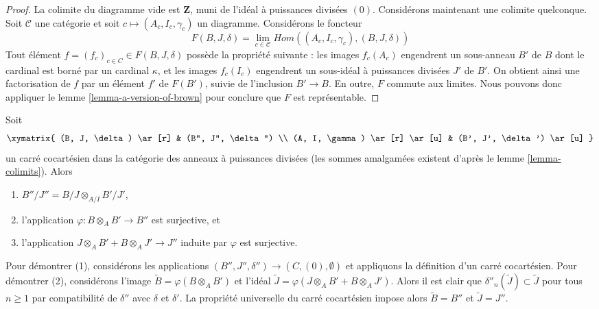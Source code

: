 \begin{proof}

La colimite du diagramme vide est $\mathbf{Z}$, muni de l'idéal à puissances divisées $(0)$. Considérons maintenant une colimite quelconque. Soit $\mathcal{C}$ une catégorie et soit
$c \mapsto (A_c, I_c, \gamma_c)$ un diagramme. Considérons le foncteur
$$
F(B, J, \delta) = \lim_{c \in \mathcal{C}}
Hom((A_c, I_c, \gamma_c), (B, J, \delta))
$$
Tout élément $f = (f_c)_{c \in C} \in F(B, J, \delta)$ possède la propriété suivante : les images $f_c(A_c)$ engendrent un sous-anneau $B'$ de $B$ dont le cardinal est borné par un cardinal $\kappa$, et les images $f_c(I_c)$ engendrent un sous-idéal à puissances divisées $J'$ de $B'$. On obtient ainsi une factorisation de
$f$ par un élément $f'$ de $F(B')$, suivie de l'inclusion $B' \to B$. En outre,
$F$ commute aux limites. Nous pouvons donc appliquer le lemme \ref{lemma-a-version-of-brown}
pour conclure que $F$ est représentable.

\end{proof}

\begin{remark}

\label{remark-pushout}

Soit
$$
\xymatrix{
(B, J, \delta) \ar[r] & (B'', J'', \delta'') \\
(A, I, \gamma) \ar[r] \ar[u] & (B', J', \delta') \ar[u]
}
$$
un carré cocartésien dans la catégorie des anneaux à puissances divisées (les sommes amalgamées existent d'après le lemme \ref{lemma-colimits}). Alors

\begin{enumerate}

\item  $B''/J'' = B/J \otimes_{A/I} B'/J'$,
\item l'application $\varphi : B \otimes_A B' \to B''$ est surjective, et
\item l'application $J \otimes_A B' + B \otimes_A J' \to J''$ induite par $\varphi$
est surjective.

\end{enumerate}

Pour démontrer (1), considérons les applications $(B'', J'', \delta'') \to (C, (0), \emptyset)$
et appliquons la définition d'un carré cocartésien. Pour démontrer (2), considérons l'image $\tilde B = \varphi(B \otimes_A B')$ et l'idéal
$\tilde J = \varphi(J \otimes_A B' + B \otimes_A J')$. Alors il est clair que $\delta''_n(\tilde J) \subset \tilde J$ pour tous $n \geq 1$
par compatibilité de $\delta''$ avec $\delta$ et $\delta'$. La propriété universelle du carré cocartésien impose alors $\tilde B = B''$ et $\tilde J = J''$.

\end{remark}

